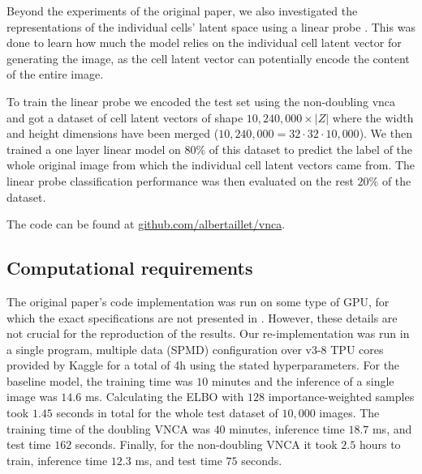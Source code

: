 Beyond the experiments of the original paper, we also investigated the representations of the individual cells' latent space using a linear probe \cite{linearprobe}. This was done to learn how much the model relies on the individual cell latent vector for generating the image, as the cell latent vector can potentially encode the content of the entire image.

To train the linear probe we encoded the test set using the non-doubling vnca and got a dataset of cell latent vectors of shape $10,240,000 \times |Z|$ where the width and height dimensions have been merged ($10,240,000 = 32 \cdot 32 \cdot 10,000$). We then trained a one layer linear model on $80\%$ of this dataset to predict the label of the whole original image from which the individual cell latent vectors came from. The linear probe classification performance was then evaluated on the rest $20\%$ of the dataset.   

The code can be found at \href{https://github.com/albertaillet/vnca/}{github.com/albertaillet/vnca}.

\subsection{Computational requirements}

The original paper's code implementation was run on some type of GPU, for which the exact specifications are not presented in \cite{palm2022variational}. However, these details are not crucial for the reproduction of the results. Our re-implementation was run in a single program, multiple data (SPMD) configuration over v3-8 TPU cores provided by Kaggle for a total of 4h using the stated hyperparameters. For the baseline model, the training time was $10$ minutes and the inference of a single image was $14.6$ ms. Calculating the ELBO with $128$ importance-weighted samples took $1.45$ seconds in total for the whole test dataset of $10,000$ images. The training time of the doubling VNCA was $40$ minutes, inference time $18.7$ ms, and test time $162$ seconds. Finally, for the non-doubling VNCA it took $2.5$ hours to train, inference time $12.3$ ms, and test time $75$ seconds.

